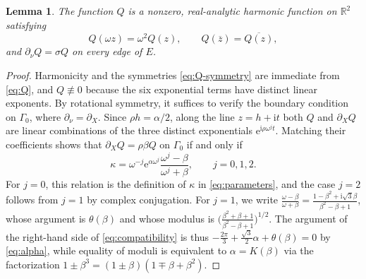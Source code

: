 \documentclass[11pt,reqno]{amsart}
\numberwithin{equation}{section}
\newtheorem{lemma}[lemma]{Lemma}
\theoremstyle{remark}
\newcommand{\R}{\mathbb R}
\newcommand{\ii}{\mathrm i}
\newcommand{\ee}{\mathrm e}
\newcommand{\om}{\omega}
\begin{document}
\begin{lemma}\label{lem:mode}
The function $Q$ is a nonzero, real-analytic harmonic function on $\R^2$ satisfying
\begin{equation}\label{eq:Q-symmetry}
 Q(\om z)=\om^2Q(z),\qquad Q(\overline z)=\overline{Q(z)},
\end{equation}
and $\partial_\nu Q=\widehat\sigma Q$ on every edge of $E$.
\end{lemma}
\begin{proof}
Harmonicity and the symmetries \eqref{eq:Q-symmetry} are immediate from
\eqref{eq:Q}, and $Q\not\equiv0$ because the six exponential terms have distinct
linear exponents. By rotational symmetry, it suffices to verify the boundary
condition on $\Gamma_0$, where $\partial_\nu=\partial_X$. Since $\rho h=\alpha/2$,
along the line $z=h+\ii t$ both $Q$ and $\partial_XQ$ are linear combinations of
the three distinct exponentials $\ee^{\ii\rho\om^jt}$. Matching their coefficients
shows that $\partial_XQ=\rho\beta Q$ on $\Gamma_0$ if and only if
\begin{equation}\label{eq:compatibility}
 \kappa=\om^{-j}\ee^{\alpha\om^j}\frac{\om^j-\beta}{\om^j+\beta},
 \qquad j=0,1,2.
\end{equation}
For $j=0$, this relation is the definition of $\kappa$ in \eqref{eq:parameters},
and the case $j=2$ follows from $j=1$ by complex conjugation. For $j=1$, we write
$\frac{\om-\beta}{\om+\beta}=\frac{1-\beta^2+\ii\sqrt3\beta}{\beta^2-\beta+1}$,
whose argument is $\theta(\beta)$ and whose modulus is
$\bigl(\frac{\beta^2+\beta+1}{\beta^2-\beta+1}\bigr)^{1/2}$. The argument
of the right-hand side of \eqref{eq:compatibility} is thus
$-\frac{2\pi}3+\frac{\sqrt3}2\alpha+\theta(\beta)=0$ by \eqref{eq:alpha},
while equality of moduli is equivalent to $\alpha=K(\beta)$ via the factorization
$1\pm\beta^3=(1\pm\beta)(1\mp\beta+\beta^2)$.
\end{proof}
\end{document}
